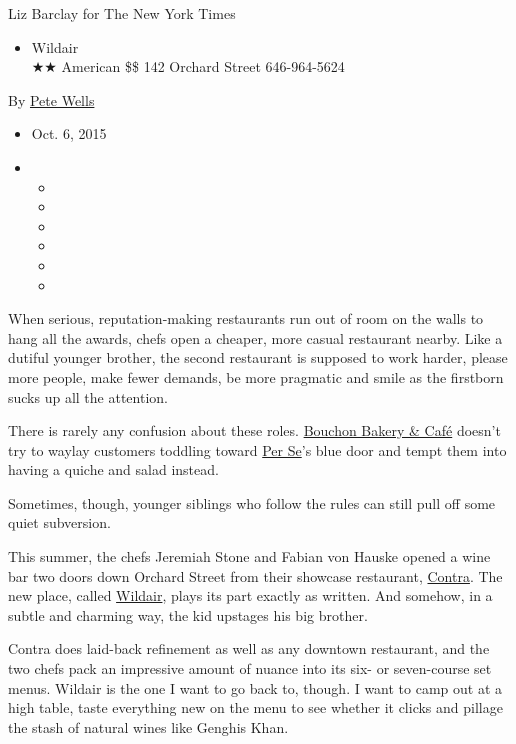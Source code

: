 Liz Barclay for The New York Times

\begin{itemize}
\tightlist
\item
  Wildair\\
  ★★ American \$\$ 142 Orchard Street 646-964-5624
\end{itemize}

By \href{http://www.nytimes3xbfgragh.onion/by/pete-wells}{Pete Wells}

\begin{itemize}
\item
  Oct. 6, 2015
\item
  \begin{itemize}
  \item
  \item
  \item
  \item
  \item
  \item
  \end{itemize}
\end{itemize}

When serious, reputation-making restaurants run out of room on the walls
to hang all the awards, chefs open a cheaper, more casual restaurant
nearby. Like a dutiful younger brother, the second restaurant is
supposed to work harder, please more people, make fewer demands, be more
pragmatic and smile as the firstborn sucks up all the attention.

There is rarely any confusion about these roles.
\href{http://www.thomaskeller.com/time-warner-new-york/bouchon-bakery-caf\%C3\%A9}{Bouchon
Bakery \& Café} doesn't try to waylay customers toddling toward
\href{http://www.nytimes3xbfgragh.onion/2011/10/12/dining/reviews/per-se-nyc-restaurant-review.html}{Per
Se}'s blue door and tempt them into having a quiche and salad instead.

Sometimes, though, younger siblings who follow the rules can still pull
off some quiet subversion.

This summer, the chefs Jeremiah Stone and Fabian von Hauske opened a
wine bar two doors down Orchard Street from their showcase restaurant,
\href{http://www.nytimes3xbfgragh.onion/2014/03/12/dining/restaurant-review-contra-on-the-lower-east-side.html}{Contra}.
The new place, called \href{http://www.wildair.nyc/}{Wildair}, plays its
part exactly as written. And somehow, in a subtle and charming way, the
kid upstages his big brother.

Contra does laid-back refinement as well as any downtown restaurant, and
the two chefs pack an impressive amount of nuance into its six- or
seven-course set menus. Wildair is the one I want to go back to, though.
I want to camp out at a high table, taste everything new on the menu to
see whether it clicks and pillage the stash of natural wines like
Genghis Khan.

